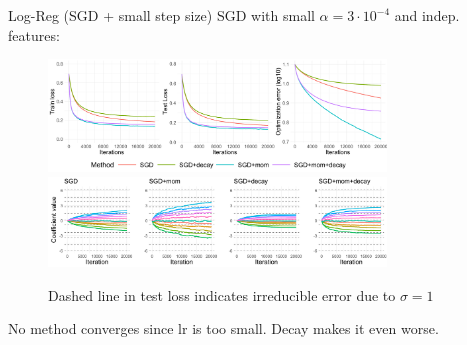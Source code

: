 \documentclass[11pt,compress,t,notes=noshow, xcolor=table]{beamer}
\begin{document}
\begin{vbframe}{Log-Reg (SGD + small step size)}
\vspace{-0.4cm}
SGD with small $\alpha=3\cdot10^{-4}$ and indep. features:
\begin{figure}
            \includegraphics[width=0.8\textwidth]{slides/04-multivariate-first-order/figure_man/simu_linmod/SGD_log_small_lr_iters.pdf} \\
             \includegraphics[width=0.8\textwidth]{slides/04-multivariate-first-order/figure_man/simu_linmod/SGD_log_coef_small.pdf}\\
            \begin{footnotesize}
                Dashed line in test loss indicates irreducible error due to $\sigma=1$
            \end{footnotesize}
\end{figure}
No method converges since lr is too small. Decay makes it even worse. 
\end{vbframe}
\end{document}
